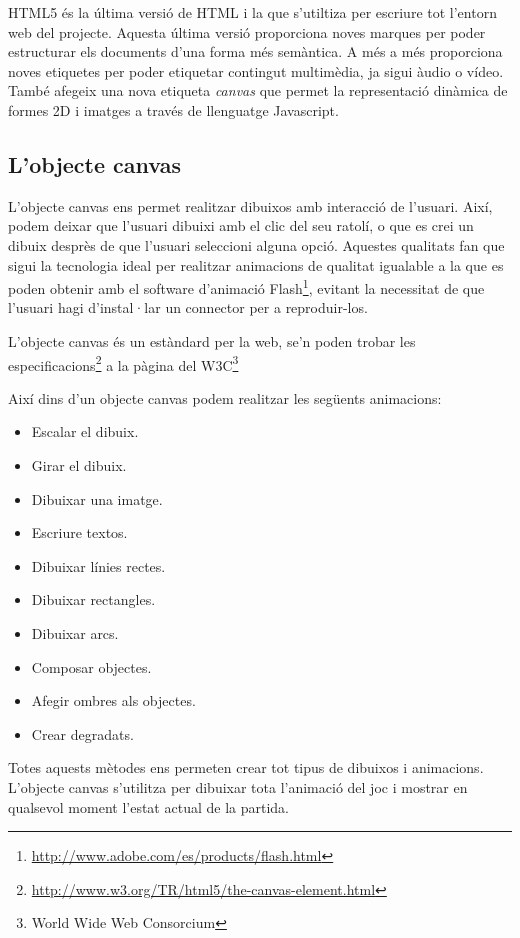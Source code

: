 HTML5 és la última versió de HTML i la que s'utiltiza per escriure tot l'entorn web del projecte. Aquesta última versió proporciona noves marques per poder estructurar els documents d'una forma més semàntica. A més a més proporciona noves etiquetes per poder etiquetar contingut multimèdia, ja sigui àudio o vídeo. També afegeix una nova etiqueta \emph{canvas} que permet la representació dinàmica de formes 2D i imatges a través de llenguatge Javascript. 

\subsection{L'objecte canvas}

L'objecte canvas ens permet realitzar dibuixos amb interacció de l'usuari. Així, podem deixar que l'usuari dibuixi amb el clic del seu ratolí, o que es crei un dibuix desprès de que l'usuari seleccioni alguna opció. Aquestes qualitats fan que sigui la tecnologia ideal per realitzar animacions de qualitat igualable a la que es poden obtenir amb el software d'animació Flash\footnote{\url{http://www.adobe.com/es/products/flash.html}}, evitant la necessitat de que l'usuari hagi d'instal·lar un connector per a reproduir-los. 

L'objecte canvas és un estàndard per la web, se'n poden trobar les especificacions\footnote{\url{http://www.w3.org/TR/html5/the-canvas-element.html}} a la pàgina del W3C\footnote{World Wide Web Consorcium}

Així dins d'un objecte canvas podem realitzar les següents animacions: 

\begin{itemize}
\item{Escalar el dibuix.}
\item{Girar el dibuix.}
\item{Dibuixar una imatge.}
\item{Escriure textos.}
\item{Dibuixar línies rectes.}
\item{Dibuixar rectangles.}
\item{Dibuixar arcs.}
\item{Composar objectes.}
\item{Afegir ombres als objectes.}
\item{Crear degradats.}
\end{itemize}

Totes aquests mètodes ens permeten crear tot tipus de dibuixos i animacions. L'objecte canvas s'utilitza per dibuixar tota l'animació del joc i mostrar en qualsevol moment l'estat actual de la partida. 


